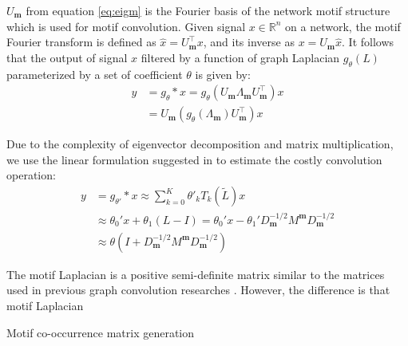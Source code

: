 \documentclass{article}
\theoremstyle{definition}
\begin{document}
$U_{\mathbf{m}}$ from equation \ref{eq:eigm} is the Fourier basis of the 
network motif structure which is used for motif convolution. Given signal
$x \in \mathds{R}^n$ on a network, the motif Fourier transform is defined
as $\hat{x} = U_{\mathbf{m}}^{\top}x$, and its inverse as 
$x = U_{\mathbf{m}}\hat{x}$. It follows that the output of signal $x$
filtered by a function of graph Laplacian $g_{\theta}(L)$ parameterized
by a set of coefficient $\theta$ is given by:
\begin{equation} \label{eq:filter}
\begin{aligned}
y &= g_{\theta} \ast x =  g_\theta (U_{\mathbf{m}} \Lambda_{\mathbf{m}} U_{\mathbf{m}}^\top) x \\
&= U_{\mathbf{m}} (g_\theta(\Lambda_{\mathbf{m}}) U^\top_{\mathbf{m}})x
\end{aligned}
\end{equation}   

Due to the complexity of eigenvector decomposition and matrix 
multiplication, we use the linear formulation suggested in \cite{gcn} to 
estimate the costly convolution operation: 
\begin{equation} \label{eq:linear}
\begin{aligned}
y &= g_{\theta'} \ast x \approx \sum_{k=0}^K \theta'_k T_k(\tilde{L})x \\
&\approx \theta_0' x + \theta_1 (L - I) = \theta_0' x - \theta_1' D^{-1/2}_{\mathbf{m}}
M^{\mathbf{m}}D^{-1/2}_{\mathbf{m}} \\
&\approx \theta \left( I + D^{-1/2}_{\mathbf{m}}
M^{\mathbf{m}}D^{-1/2}_{\mathbf{m}} \right)
\end{aligned}
\end{equation} 

The motif Laplacian is a positive semi-definite matrix
similar to the matrices used in previous graph convolution researches 
\cite{hammond2011wavelets,defferrard2016convolutional,gcn}. However,
the difference is that motif Laplacian 




\begin{algorithm}[h] \label{al:madj}
\caption{Motif co-occurrence matrix generation}
\end{algorithm}
\end{document}
